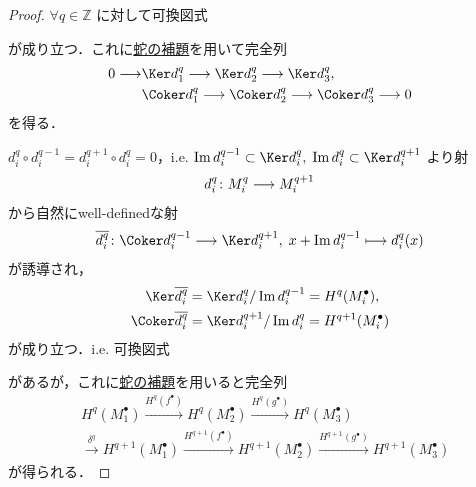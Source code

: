 \documentclass[algtopo_main]{subfiles}
\begin{document}
\begin{proof}
    $\forall q \in \mathbb{Z}$ に対して可換図式
    \begin{center}
        \centering
    \end{center}
    が成り立つ．これに\hyperref[thm:snake]{蛇の補題}を用いて完全列
    \begin{align}
        0 \lto &\Ker d_1^q \lto \Ker d_2^q \lto \Ker d_3^q, \\
        &\Coker d_1^q \lto \Coker d_2^q \lto \Coker d_3^q \lto 0
    \end{align}
    を得る．
    
    $d_i^q \circ d_i^{q-1} = d_i^{q+1} \circ d_i^q = 0$，i.e. $\Im d_i^{q-1} \subset \Ker d_i^q,\; \Im d_i^q \subset \Ker d_i^{q+1}$ より射
    \begin{align}
        d_i^q \colon M_i^q \longrightarrow M_i^{q+1}
    \end{align}
    から自然にwell-definedな射
    \begin{align}
        \overline{d_i^q} \colon \Coker d_i^{q-1} \lto \Ker d_i^{q+1},\; x + \Im d_i^{q-1} \lmto d_i^q(x)
    \end{align}
    が誘導され，
    \begin{align}
        \Ker \overline{d_i^q} &= \Ker d_i^{q} / \Im d_i^{q-1} = H^q(M_i^\bullet), \\
        \Coker \overline{d_i^q} &= \Ker d_i^{q+1} / \Im d_i^{q} = H^{q+1}(M_i^\bullet)
    \end{align}
    が成り立つ．i.e. 可換図式
    \begin{center}
    \end{center}
    があるが，これに\hyperref[thm:snake]{蛇の補題}を用いると完全列
    \begin{align}
        &H^q(M_1^\bullet) \xrightarrow{H^q(f^\bullet)} H^q(M_2^\bullet) \xrightarrow{H^q(g^\bullet)} H^q(M_3^\bullet) \\
        &\xrightarrow{\delta^{q}} H^{q+1}(M_1^\bullet) \xrightarrow{H^{q+1}(f^\bullet)} H^{q+1}(M_2^\bullet) \xrightarrow{H^{q+1}(g^\bullet)} H^{q+1}(M_3^\bullet)
    \end{align}
    が得られる．
\end{proof}
\end{document}

